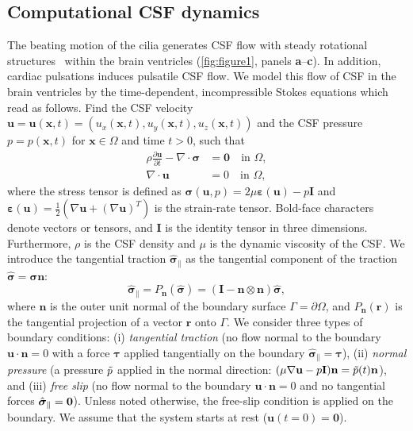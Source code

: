 \documentclass[fleqn]{wlscirep}
\newcommand{\pdifft}[1]{\frac{\partial  #1}{\partial t}}
\newcommand{\nn}{\mathbf{n}}
\newcommand{\rr}{\mathbf{r}}
\newcommand{\uu}{\mathbf{u}}
\newcommand{\xx}{\bm{x}}
\newcommand{\bsig}{\bm{\sigma}}
\newcommand{\bsigpar}{\hat{\bsig}_{\parallel}}
\newcommand{\beps}{\bm{\varepsilon}}
\newcommand{\btau}{\bm{\tau}}
\begin{document}
\subsection*{Computational CSF dynamics}

The beating motion of the cilia generates CSF flow with steady rotational structures~\cite{Olstad2019CiliaryDevelopment} within the brain ventricles (\cref{fig:figure1}, panels \textbf{a}--\textbf{c}). In addition, cardiac pulsations induces pulsatile CSF flow. We model this flow of CSF in the brain ventricles by the time-dependent, incompressible Stokes equations which read as follows. Find the CSF velocity $\uu = \uu(\xx, t) = (u_x(\xx, t), u_y(\xx, t), u_z(\xx, t))$ and the CSF pressure $p = p(\xx, t)$ for $\xx \in \Omega$ and time $t>0$, such that
\begin{subequations}
    \begin{align}
      \rho \pdifft{\uu} - \nabla \cdot \bsig &= \mathbf{0}
      \quad \text{in } \Omega,
      \label{eq:stokes_eq_mom}\\
      \nabla \cdot \uu &= 0
      \quad  \text{in } \Omega,
  \end{align}
  \label{eq:stokes_eqs}%
\end{subequations}%
where the stress tensor is defined as $\bsig(\uu, p) = 2\mu\beps(\uu) - p\mathbf{I}$ and $\beps(\uu) = \frac{1}{2}\left(\nabla \uu + (\nabla\uu)^T\right)$ is the strain-rate tensor. Bold-face characters denote vectors or tensors, and $\mathbf{I}$ is the identity tensor in three dimensions. Furthermore, $\rho$ is the CSF density and $\mu$ is the dynamic viscosity of the CSF. We introduce the tangential traction $\bsigpar$ as the tangential component of the traction $\hat{\bsig}=\bsig\nn$:
\begin{equation*}
    \bsigpar = P_{\nn}(\hat{\bsig}) = (\mathbf{I} - \nn\otimes\nn)\hat{\bsig},
\end{equation*}
where $\nn$ is the outer unit normal of the boundary surface $\Gamma = \partial\Omega$, and $P_{\nn}(\rr)$ is the tangential  projection of a vector $\rr$ onto $\Gamma$. We consider three types of boundary conditions:  (i) \emph{tangential traction} (no flow normal to the boundary $\uu \cdot \nn = 0$ with a force $\btau$ applied tangentially on the boundary $\bsigpar = \btau$), (ii) \emph{normal pressure} (a pressure $\Tilde{p}$ applied in the normal direction: $(\mu\nabla\uu - p\mathbf{I})\nn = \Tilde{p}(t)\nn$), and (iii) \emph{free slip} (no flow normal to the boundary $\uu \cdot \nn = 0$ and no tangential forces $\bsigpar = {\bf 0}$). Unless noted otherwise, the free-slip condition is applied on the boundary. We assume that the system starts at rest ($\uu(t = 0) = \mathbf{0}$).
\end{document}
